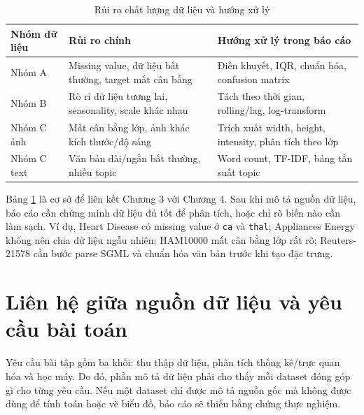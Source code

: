 \begin{table}[H]
\centering
\caption{Rủi ro chất lượng dữ liệu và hướng xử lý}
\label{tab:chapter2_data_quality_risk}
\small
\begin{tabular}{p{}p{}p{}}
\toprule
Nhóm dữ liệu & Rủi ro chính & Hướng xử lý trong báo cáo \\
\midrule
Nhóm A & Missing value, dữ liệu bất thường, target mất cân bằng & Điền khuyết, IQR, chuẩn hóa, confusion matrix \\
Nhóm B & Rò rỉ dữ liệu tương lai, seasonality, scale khác nhau & Tách theo thời gian, rolling/lag, log-transform \\
Nhóm C ảnh & Mất cân bằng lớp, ảnh khác kích thước/độ sáng & Trích xuất width, height, intensity, phân tích theo lớp \\
Nhóm C text & Văn bản dài/ngắn bất thường, nhiều topic & Word count, TF-IDF, bảng tần suất topic \\
\bottomrule
\end{tabular}
\end{table}

Bảng \ref{tab:chapter2_data_quality_risk} là cơ sở để liên kết Chương 3 với Chương 4. Sau khi mô tả nguồn dữ liệu, báo cáo cần chứng minh dữ liệu đủ tốt để phân tích, hoặc chỉ rõ biến nào cần làm sạch. Ví dụ, Heart Disease có missing value ở \texttt{ca} và \texttt{thal}; Appliances Energy không nên chia dữ liệu ngẫu nhiên; HAM10000 mất cân bằng lớp rất rõ; Reuters-21578 cần bước parse SGML và chuẩn hóa văn bản trước khi tạo đặc trưng.

\section{Liên hệ giữa nguồn dữ liệu và yêu cầu bài toán}

Yêu cầu bài tập gồm ba khối: thu thập dữ liệu, phân tích thống kê/trực quan hóa và học máy. Do đó, phần mô tả dữ liệu phải cho thấy mỗi dataset đóng góp gì cho từng yêu cầu. Nếu một dataset chỉ được mô tả nguồn gốc mà không được dùng để tính toán hoặc vẽ biểu đồ, báo cáo sẽ thiếu bằng chứng thực nghiệm.

